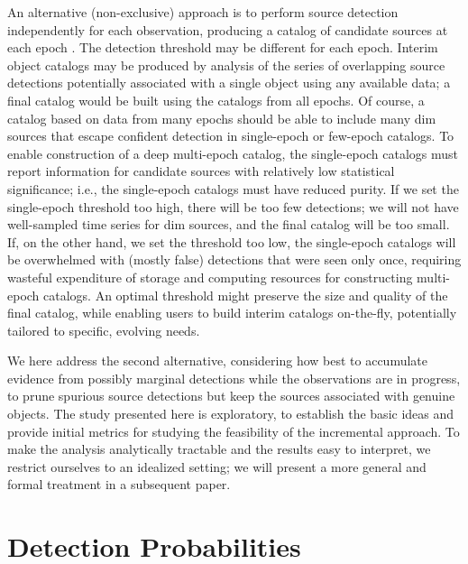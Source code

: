 \documentclass[twocolumn]{emulateapj}
\newcommand\enote[1]{ {\color{red}%
\marginpar[\raggedleft\large $\blacktriangleright$]%
{\raggedright\large $\blacktriangleleft$} %
{\large $\langle\langle\langle$}{\sl #1}{\large  $\rangle\rangle\rangle$} }}
\newcommand\tamas[1]{{\color{blue}#1 [Tamas]}}
\begin{document}
An alternative (non-exclusive) approach is to perform source detection independently for each observation, producing a catalog of candidate sources at each epoch \citep{BS14-ADASS}.
The detection threshold may be different for each epoch. 
Interim object catalogs may be produced by analysis of the series of overlapping source detections potentially associated with a single object using any available data; a final catalog would be built using the catalogs from all epochs.
Of course, a catalog based on data from many epochs should be able to include many dim sources that escape confident detection in single-epoch or few-epoch catalogs.
To enable construction of a deep multi-epoch catalog, the single-epoch catalogs must report information for candidate sources with relatively low statistical significance; i.e., the single-epoch catalogs must have reduced purity.
If we set the single-epoch threshold too high, there will be too few detections; we will not have well-sampled time series for dim sources, and the final catalog will be too small.
If, on the other hand, we set the threshold too low, the single-epoch catalogs will be overwhelmed with (mostly false) detections that were seen only once, requiring wasteful expenditure of storage and computing resources for constructing multi-epoch catalogs.
An optimal threshold might preserve the size and quality of the final catalog, while enabling users to build interim catalogs on-the-fly, potentially tailored to specific, evolving needs.

\iffalse
\enote{Maybe clarify here whether we envision this as useful to end-users, or only for survey data management teams. To me it seems we should leave open the former possibility; if so, we may not need to add anything here.}
\tamas{I agree.}
\fi

We here address the second alternative, considering how best to accumulate evidence from possibly marginal detections while the observations are in progress, to prune spurious source detections but keep the sources associated with genuine objects.
The study presented here is exploratory, to establish the basic ideas and provide initial metrics for studying the feasibility of the incremental approach.
To make the analysis analytically tractable and the results easy to interpret, we restrict ourselves to an idealized setting; we will present a more general and formal treatment in a subsequent paper.

\section{Detection Probabilities} 
\label{sec:det}
\end{document}
